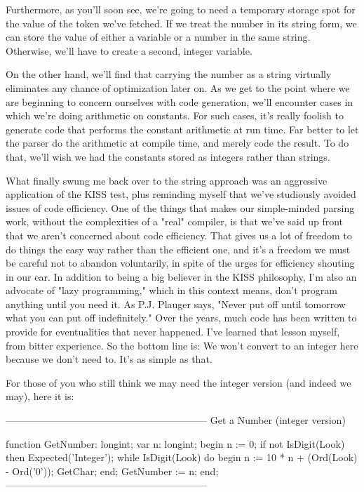 \documentclass[float=false, crop=false]{standalone}
\begin{document}
Furthermore, as you'll soon see, we're going to need a temporary storage spot
for the value of the token we've fetched. If we treat the number in its string
form, we can store the value of either a variable or a number in the same
string. Otherwise, we'll have to create a second, integer variable.

On the other hand, we'll find that carrying the number as a string virtually
eliminates any chance of optimization later on. As we get to the point where we
are beginning to concern ourselves with code generation, we'll encounter cases
in which we're doing arithmetic on constants. For such cases, it's really
foolish to generate code that performs the constant arithmetic at run time. Far
better to let the parser do the arithmetic at compile time, and merely code the
result. To do that, we'll wish we had the constants stored as integers rather
than strings.

What finally swung me back over to the string approach was an aggressive
application of the KISS test, plus reminding myself that we've studiously
avoided issues of code efficiency. One of the things that makes our
simple-minded parsing work, without the complexities of a "real" compiler, is
that we've said up front that we aren't concerned about code efficiency. That
gives us a lot of freedom to do things the easy way rather than the efficient
one, and it's a freedom we must be careful not to abandon voluntarily, in spite
of the urges for efficiency shouting in our ear. In addition to being a big
believer in the KISS philosophy, I'm also an advocate of "lazy programming,"
which in this context means, don't program anything until you need it. As P.J.
Plauger says, "Never put off until tomorrow what you can put off indefinitely."
Over the years, much code has been written to provide for eventualities that
never happened. I've learned that lesson myself, from bitter experience. So the
bottom line is: We won't convert to an integer here because we don't need to.
It's as simple as that.

For those of you who still think we may need the integer version (and indeed we
may), here it is:

\begin{code}
{--------------------------------------------------------------}
{ Get a Number (integer version) }

function GetNumber: longint;
var n: longint;
begin
	n := 0;
	if not IsDigit(Look) then Expected('Integer');
	while IsDigit(Look) do begin
		n := 10 * n + (Ord(Look) - Ord('0'));
		GetChar;
	end;
	GetNumber := n;
end;
{--------------------------------------------------------------}
\end{code}
\end{document}
